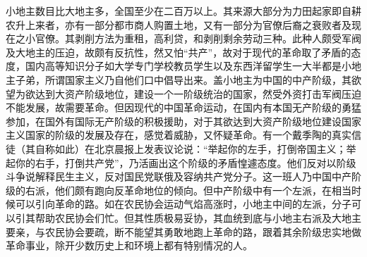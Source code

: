 小地主数目比大地主多，全国至少在二百万以上。其来源大部分为力田起家即自耕农升上来者，亦有一部分都市商人购置土地，又有一部分为官僚后裔之衰败者及现在之小官僚。其剥削方法为重租，高利贷，和剥削剩余劳动三种。此种人颇受军阀及大地主的压迫，故颇有反抗性，然又怕“共产”，故对于现代的革命取了矛盾的态度，国内高等知识分子如大学专门学校教员学生以及东西洋留学生一大半都是小地主子弟，所谓国家主义乃自他们口中倡导出来。盖小地主为中国的中产阶级，其欲望为欲达到大资产阶级地位，建设一个一阶级统治的国家，然受外资打击军阀压迫不能发展，故需要革命。但因现代的中国革命运动，在国内有本国无产阶级的勇猛参加，在国外有国际无产阶级的积极援助，对于其欲达到大资产阶级地位建设国家主义国家的阶级的发展及存在，感觉着威胁，又怀疑革命。有一个戴季陶的真实信徒（其自称如此）在北京晨报上发表议论说：“举起你的左手，打倒帝国主义；举起你的右手，打倒共产党”，乃活画出这个阶级的矛盾惶遽态度。他们反对以阶级斗争说解释民生主义，反对国民党联俄及容纳共产党分子。这一班人乃中国中产阶级的右派，他们颇有跑向反革命地位的倾向。但中产阶级中有一个左派，在相当时候可以引向革命的路。如在农民协会运动气焰高涨时，小地主中间的左派，分子可以引其帮助农民协会们忙。但其性质极易妥协，其血统到底与小地主右派及大地主要亲，与农民协会要疏，断不能望其勇敢地跑上革命的路，跟着其余阶级忠实地做革命事业，除开少数历史上和环境上都有特别情况的人。

